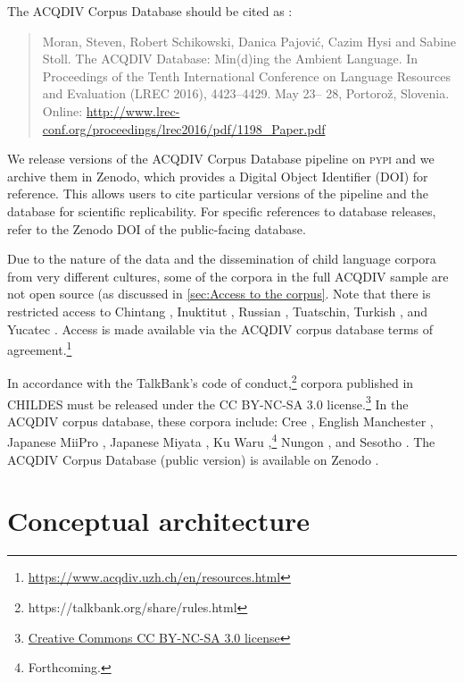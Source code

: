 \documentclass[a4paper, 11pt]{book}
\begin{document}
\noindent The ACQDIV Corpus Database should be cited as \cite{Moran_etal2016a}: 

\begin{quote}
Moran, Steven, Robert Schikowski, Danica Pajović, Cazim Hysi and Sabine Stoll. The ACQDIV Database: Min(d)ing the Ambient Language. In Proceedings of the Tenth International Conference on Language Resources and Evaluation (LREC 2016), 4423–4429. May 23– 28, Portorož, Slovenia. Online: \url{http://www.lrec-conf.org/proceedings/lrec2016/pdf/1198_Paper.pdf}
\end{quote}

We release versions of the ACQDIV Corpus Database pipeline on \textsc{pypi} and we archive them in Zenodo, which provides a Digital Object Identifier (DOI) for reference. This allows users to cite particular versions of the pipeline and the database for scientific replicability. For specific references to database releases, refer to the Zenodo DOI of the public-facing database.

Due to the nature of the data and the dissemination of child language corpora from very different cultures, some of the corpora in the full ACQDIV sample are not open source (as discussed in \autoref{sec:Access to the corpus}. Note that there is restricted access to Chintang \citep{Stoll_etal2015b-unpublished}, Inuktitut \citep{Allen2015a}, Russian \citep{Stoll_etal2008a}, Tuatschin, Turkish \citep{Kuntay2015a}, and Yucatec \citep{Pfeiler2015a}. Access is made available via the ACQDIV corpus database terms of agreement.\footnote{\url{https://www.acqdiv.uzh.ch/en/resources.html}}

In accordance with the TalkBank's code of conduct,\footnote{https://talkbank.org/share/rules.html} corpora published in CHILDES must be released under the CC BY-NC-SA 3.0 license.\footnote{ \href{https://creativecommons.org/licenses/by-nc-sa/3.0/)}{Creative Commons CC BY-NC-SA 3.0 license}} In the ACQDIV corpus database, these corpora include: Cree \citep{Brittain2015a}, English Manchester \citep{Theakston_etal2001}, Japanese MiiPro \citep{Miyata_etal2009a,Miyata_etal2010a,Nisisawa_etal2009a,Nisisawa_etal2010a}, Japanese Miyata \citep{Miyata2004a,Miyata2004b,Miyata2004c,Miyata2012a}, Ku Waru \citep{Rumsey_etal2019},\footnote{Forthcoming.} Nungon \citep{Sarvasy2017a}, and Sesotho \citep{Demuth2015a}. The ACQDIV Corpus Database (public  version) is available on Zenodo \citep{Moran_etal2019a}.


\section{Conceptual architecture}
\label{sec:Architecture}
\end{document}
